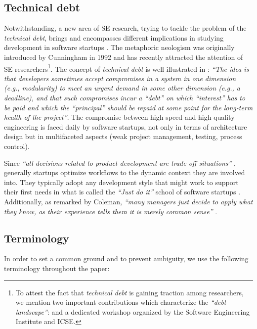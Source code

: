 \documentclass[10pt,journal,letterpaper,compsoc]{IEEEtran}
\begin{document}
\subsection{Technical debt} Notwithstanding, a new area of SE research,
trying to tackle the problem of the \textit{technical debt}, brings and
encompasses different implications in studying development in software startups
\cite{Tom2013}. The metaphoric neologism was originally introduced by
Cunningham in 1992 \cite{TechnicalDebtCunn} and has recently attracted the
attention of SE researchers\footnote{To attest the fact that \textit{technical
debt} is gaining  traction among researchers, we mention two important
contributions which characterize the \textit{``debt landscape''}:
\cite{Nugroho2011,Izurieta2012} and a dedicated workshop \cite{workshopDebt}
organized by the Software  Engineering Institute  and ICSE.}. The concept of
\textit{technical debt} is  well illustrated in
\cite{Brown:2010:MTD:1882362.1882373}: \textit{``The idea  is that developers
sometimes accept compromises in a system in one dimension  (e.g., modularity) to
meet an urgent demand in some other dimension (e.g., a  deadline), and that such
compromises incur a ``debt'' on which ``interest'' has  to be paid and which the
``principal'' should be repaid at some point for the long-term health of the
project''}.  The compromise between high-speed and high-quality engineering is
faced daily by software startups, not only in terms  of architecture design but
in multifaceted aspects (weak project management, testing, process control).

Since \textit{``all decisions related to product development are trade-off
situations''} \cite{Hilmola2003}, generally startups optimize workflows to the
dynamic context they are involved into. They typically adopt any development
style that might work to support their first needs in what is called the
\textit{``Just do it''} school of software startups \cite{Ries2011}.
Additionally, as remarked by Coleman, \textit{``many managers just decide to
apply what they know, as their experience tells them it is merely common
sense''} \cite{Coleman2008}.

\subsection{Terminology} In order to set a common ground and to prevent
ambiguity, we use the following  terminology throughout the paper:
\end{document}
